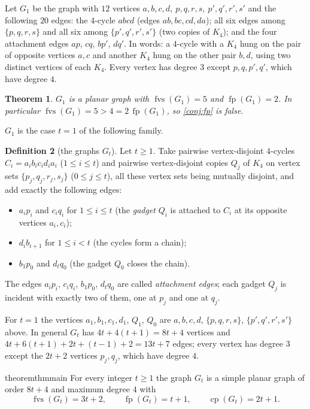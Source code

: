 \documentclass[11pt,a4paper]{article}
\theoremstyle{plain}
\newtheorem{theorem}{Theorem}[section]
\theoremstyle{definition}
\newtheorem{definition}[theorem]{Definition}
\theoremstyle{remark}
\providecommand{\tightlist}{\setlength{\itemsep}{0pt}\setlength{\parskip}{0pt}}
\newcommand{\fvs}{\operatorname{fvs}}
\newcommand{\cp}{\operatorname{cp}}
\newcommand{\fp}{\operatorname{fp}}
\newcommand{\Gtt}{G_t}
\begin{document}
Let $G_1$ be the graph with $12$ vertices $a,b,c,d,\ p,q,r,s,\ p',q',r',s'$ and the following $20$ edges: the $4$-cycle $abcd$ (edges $ab,bc,cd,da$); all six edges among $\{p,q,r,s\}$ and all six among $\{p',q',r',s'\}$ (two copies of $K_4$); and the four attachment edges $ap$, $cq$, $bp'$, $dq'$. In words: a $4$-cycle with a $K_4$ hung on the pair of opposite vertices $a,c$ and another $K_4$ hung on the other pair $b,d$, using two distinct vertices of each $K_4$. Every vertex has degree $3$ except $p,q,p',q'$, which have degree $4$.

\begin{theorem}\label{thm:G1}
$G_1$ is a planar graph with $\fvs(G_1)=5$ and $\fp(G_1)=2$. In particular $\fvs(G_1)=5>4=2\,\fp(G_1)$, so \cref{conj:fp} is false.
\end{theorem}

$G_1$ is the case $t=1$ of the following family.

\begin{definition}[the graphs $\Gtt$]\label{def:Gt}
Let $t\ge1$. Take pairwise vertex-disjoint $4$-cycles $C_i=a_ib_ic_id_ia_i$ ($1\le i\le t$) and pairwise vertex-disjoint copies $Q_j$ of $K_4$ on vertex sets $\{p_j,q_j,r_j,s_j\}$ ($0\le j\le t$), all these vertex sets being mutually disjoint, and add exactly the following edges:
\begin{itemize}\tightlist
\item $a_ip_i$ and $c_iq_i$ for $1\le i\le t$ (the \emph{gadget} $Q_i$ is attached to $C_i$ at its opposite vertices $a_i,c_i$);
\item $d_ib_{i+1}$ for $1\le i<t$ (the cycles form a chain);
\item $b_1p_0$ and $d_tq_0$ (the gadget $Q_0$ closes the chain).
\end{itemize}
The edges $a_ip_i$, $c_iq_i$, $b_1p_0$, $d_tq_0$ are called \emph{attachment edges}; each gadget $Q_j$ is incident with exactly two of them, one at $p_j$ and one at $q_j$.
\end{definition}

For $t=1$ the vertices $a_1,b_1,c_1,d_1$, $Q_1$, $Q_0$ are $a,b,c,d$, $\{p,q,r,s\}$, $\{p',q',r',s'\}$ above. In general $\Gtt$ has $4t+4(t+1)=8t+4$ vertices and $4t+6(t+1)+2t+(t-1)+2=13t+7$ edges; every vertex has degree $3$ except the $2t+2$ vertices $p_j,q_j$, which have degree $4$.

\begin{restatable}{theorem}{thmmain}\label{thm:main}
For every integer $t\ge1$ the graph $\Gtt$ is a simple planar graph of order $8t+4$ and maximum degree $4$ with
\[
\fvs(\Gtt)=3t+2,\qquad \fp(\Gtt)=t+1,\qquad \cp(\Gtt)=2t+1 .
\]
\end{restatable}
\end{document}
